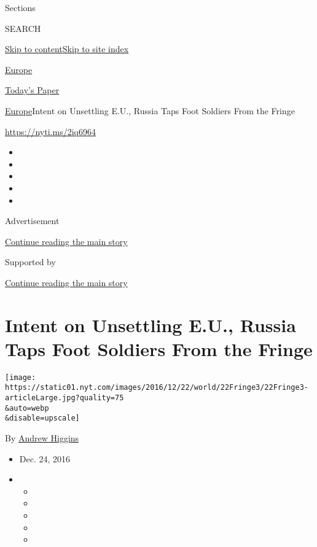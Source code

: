 Sections

SEARCH

\protect\hyperlink{site-content}{Skip to
content}\protect\hyperlink{site-index}{Skip to site index}

\href{https://www.nytimes.com/section/world/europe}{Europe}

\href{https://myaccount.nytimes.com/auth/login?response_type=cookie\&client_id=vi}{}

\href{https://www.nytimes.com/section/todayspaper}{Today's Paper}

\href{/section/world/europe}{Europe}\textbar{}Intent on Unsettling E.U.,
Russia Taps Foot Soldiers From the Fringe

\url{https://nyti.ms/2iq6964}

\begin{itemize}
\item
\item
\item
\item
\item
\end{itemize}

Advertisement

\protect\hyperlink{after-top}{Continue reading the main story}

Supported by

\protect\hyperlink{after-sponsor}{Continue reading the main story}

\hypertarget{intent-on-unsettling-eu-russia-taps-foot-soldiers-from-the-fringe}{%
\section{Intent on Unsettling E.U., Russia Taps Foot Soldiers From the
Fringe}\label{intent-on-unsettling-eu-russia-taps-foot-soldiers-from-the-fringe}}

\texttt{[image: https://static01.nyt.com/images/2016/12/22/world/22Fringe3/22Fringe3-articleLarge.jpg?quality=75\\\&auto=webp\\\&disable=upscale]}

By \href{http://www.nytimes.com/by/andrew-higgins}{Andrew Higgins}

\begin{itemize}
\item
  Dec. 24, 2016
\item
  \begin{itemize}
  \item
  \item
  \item
  \item
  \item
  \end{itemize}
\end{itemize}

